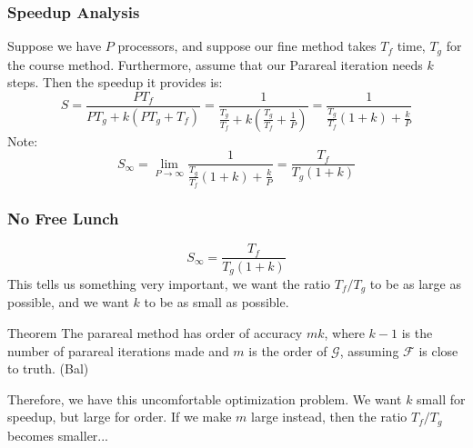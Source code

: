 \documentclass[pdf,12pt]{beamer}
\newcommand{\course}{\mathcal{G}}
\newcommand{\fine}{\mathcal{F}}
\begin{document}
\begin{frame}
  \frametitle{Speedup Analysis}
  Suppose we have $P$ processors, and suppose our fine method takes $T_f$ time,
  $T_g$ for the course method. Furthermore, assume that our Parareal iteration
  needs $k$ steps. Then the speedup it provides is:
  \[
    S = \frac{PT_f}{PT_g + k(PT_g + T_f)} 
    = \frac{1}{\frac{T_g}{T_f} + k(\frac{T_g}{T_f} + \frac{1}{P})} 
    = \frac{1}{\frac{T_g}{T_f}(1+k) + \frac{k}{P}} 
  \]
  Note:
  \[
    S_\infty = \lim_{P \to \infty} \frac{1}{\frac{T_g}{T_f}(1+k) + \frac{k}{P}} =
    \frac{T_f}{T_g(1+k)}
  \]
\end{frame}
\begin{frame}
  \frametitle{No Free Lunch}
  \[
    S_\infty = \frac{T_f}{T_g(1+k)}
  \]
  This tells us something very important, we want the ratio $T_f / T_g$ to be as
  large as possible, and we want $k$ to be as small as possible.
  \begin{block}{Theorem}
    The parareal method has order of accuracy $mk$, where $k-1$ is the number of
    parareal iterations made and $m$ is the order of $\course$, assuming $\fine$
    is close to truth. (Bal) 
  \end{block}
  Therefore, we have this uncomfortable optimization problem. We want $k$ small
  for speedup, but large for order. If we make $m$ large instead, then the ratio
  $T_f/T_g$ becomes smaller...
\end{frame}
\end{document}
